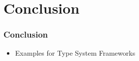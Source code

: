 \section{Conclusion}

\begin{frame}
  \frametitle{Conclusion}
  
  \begin{itemize}
    \item Examples for Type System Frameworks 
  \end{itemize}
  
\end{frame}

